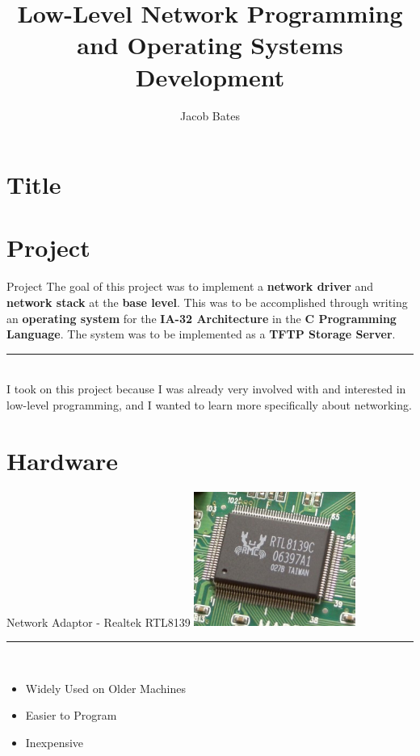 \documentclass{beamer}
\title{Low-Level Network Programming and Operating Systems Development}
\author{Jacob Bates}
\institute{Da Vinci Science High School}
\begin{document}
\section{Title}

    \begin{frame}
        \titlepage
    \end{frame}

\section{Project}

    \begin{frame}{Project}
        The goal of this project was to implement a \textbf{network driver} and \textbf{network stack} at the \textbf{base level}.
        This was to be accomplished through writing an \textbf{operating system} for the \textbf{IA-32 Architecture} in the \textbf{C Programming Language}.
        The system was to be implemented as a \textbf{TFTP Storage Server}.\\
        \rule{0.5\textwidth}{0.5pt}\\
        I took on this project because I was already very involved with and interested in low-level programming, and I wanted to learn more specifically about networking.
    \end{frame}

\section{Hardware}

    \begin{frame}{Network Adaptor - Realtek RTL8139}
        \includegraphics[height=125pt]{Realtek_RTL8139C.jpg} \\
        \rule{0.5\textwidth}{0.5pt} \\
        \begin{itemize}
            \item Widely Used on Older Machines
            \item Easier to Program
            \item Inexpensive
        \end{itemize}
    \end{frame}
\end{document}
